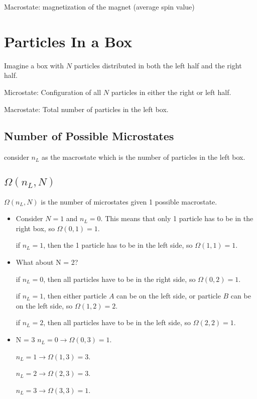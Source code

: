 \documentclass[fleqn]{report}
\begin{document}
Macrostate:
magnetization of the magnet (average spin value)

\section{Particles In a Box}
Imagine a box with $N$ particles distributed in both the left half and the right half. 

Microstate: 
Configuration of all $N$ particles in either the right or left half.

Macrostate:
Total number of particles in the left box. 

\subsection{Number of Possible Microstates}
consider $n_L$ as the macrostate which is the number of particles in the left 
box.

\subsection{$\Omega(n_L, N)$}
$\Omega(n_L, N)$ is the number of microstates given 1 possible macrostate.

\begin{itemize}
\item 
Consider $N = 1$ and $n_L = 0$.
This means that only 1 particle has to be in the right box, 
so $\Omega(0, 1) = 1$.

if $n_L = 1$, then the 1 particle has to be in the left side, so 
$\Omega(1, 1) = 1$.

\item
What about N = 2?

if $n_L = 0$, then all particles have to be in the right side,
so $\Omega(0, 2) = 1$.

if $n_L = 1$, then either particle $A$ can be on the left side, or particle $B$ 
can be on the left side, 
so $\Omega(1, 2) = 2$.

if $n_L = 2$, then all particles have to be in the left side,
so $\Omega(2, 2) = 1$.

\item N = 3
$n_L = 0
\rightarrow \Omega(0, 3) = 1$.

$n_L = 1
\rightarrow \Omega(1, 3) = 3$.

$n_L = 2
\rightarrow \Omega(2, 3) = 3$.

$n_L = 3
\rightarrow \Omega(3, 3) = 1$.

\end{itemize}
\end{document}
